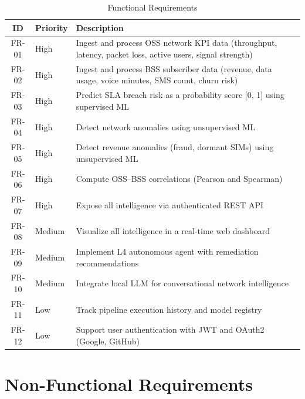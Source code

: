 \begin{table}[H]
\centering
\caption{Functional Requirements}
\label{tab:func-req}
\begin{tabular}{@{}clp{8cm}@{}}
\toprule
\textbf{ID} & \textbf{Priority} & \textbf{Description} \\
\midrule
FR-01 & High & Ingest and process OSS network KPI data (throughput, latency, packet loss, active users, signal strength) \\
FR-02 & High & Ingest and process BSS subscriber data (revenue, data usage, voice minutes, SMS count, churn risk) \\
FR-03 & High & Predict SLA breach risk as a probability score [0, 1] using supervised ML \\
FR-04 & High & Detect network anomalies using unsupervised ML \\
FR-05 & High & Detect revenue anomalies (fraud, dormant SIMs) using unsupervised ML \\
FR-06 & High & Compute OSS--BSS correlations (Pearson and Spearman) \\
FR-07 & High & Expose all intelligence via authenticated REST API \\
FR-08 & Medium & Visualize all intelligence in a real-time web dashboard \\
FR-09 & Medium & Implement L4 autonomous agent with remediation recommendations \\
FR-10 & Medium & Integrate local LLM for conversational network intelligence \\
FR-11 & Low & Track pipeline execution history and model registry \\
FR-12 & Low & Support user authentication with JWT and OAuth2 (Google, GitHub) \\
\bottomrule
\end{tabular}
\end{table}

\section{Non-Functional Requirements}

